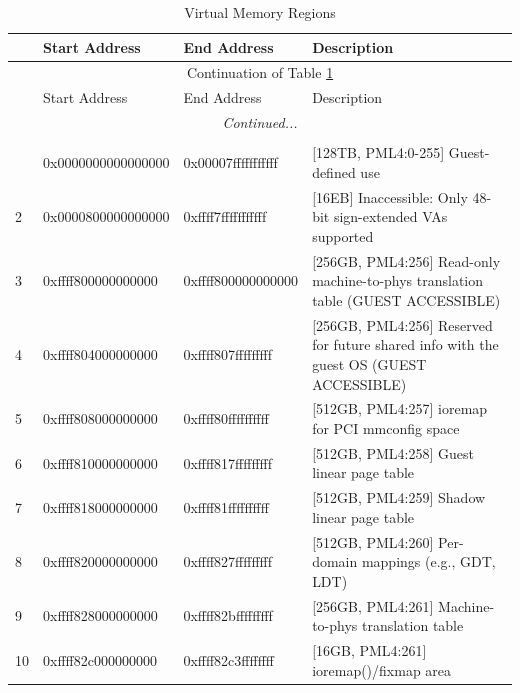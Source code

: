 \clearpage
\begin{longtable}{|m{2ex}|m{20ex}|m{18ex}|m{}|}
    \caption{Virtual Memory Regions\label{tab:xen_address}}\\
    \hline
    & Start Address      & End Address        & Description \\
    \hline
    \hline
    \endfirsthead
    \hline
    \multicolumn{4}{|c|}{Continuation of Table \ref{tab:xen_address}}\\
    \hline
    \hline
    & Start Address      & End Address        & Description \\
    \hline
    \hline
    \endhead
    \hline
    \hline
    \multicolumn{4}{|c|}{\textit{Continued...}}\\
    \hline
    \endfoot
    \hline
    \hline
    \multicolumn{4}{|c|}{End of Table \ref{tab:xen_address}}\\
    \hline
    \endlastfoot
    1  & 0x0000000000000000  & 0x00007fffffffffff & [128TB, PML4:0-255] Guest-defined use \\
    \hline
    2  & 0x0000800000000000  & 0xffff7fffffffffff & [16EB] Inaccessible: Only 48-bit sign-extended VAs supported\\
    \hline
    3  & 0xffff800000000000  & 0xffff800000000000 & [256GB, PML4:256] Read-only machine-to-phys translation table (GUEST ACCESSIBLE) \\
    \hline
    4  & 0xffff804000000000  & 0xffff807fffffffff & [256GB, PML4:256] Reserved for future shared info with the guest OS (GUEST ACCESSIBLE) \\
    \hline
    5  & 0xffff808000000000  & 0xffff80ffffffffff & [512GB, PML4:257] ioremap for PCI mmconfig space \\
    \hline
    6  & 0xffff810000000000  & 0xffff817fffffffff & [512GB, PML4:258] Guest linear page table \\
    \hline
    7  & 0xffff818000000000  & 0xffff81ffffffffff & [512GB, PML4:259] Shadow linear page table \\
    \hline
    8  & 0xffff820000000000  & 0xffff827fffffffff & [512GB, PML4:260] Per-domain mappings (e.g., GDT, LDT) \\
    \hline
    9  & 0xffff828000000000  & 0xffff82bfffffffff & [256GB, PML4:261] Machine-to-phys translation table \\
    \hline
    10 & 0xffff82c000000000  & 0xffff82c3ffffffff & [16GB, PML4:261] ioremap()/fixmap area \\

\end{longtable}
